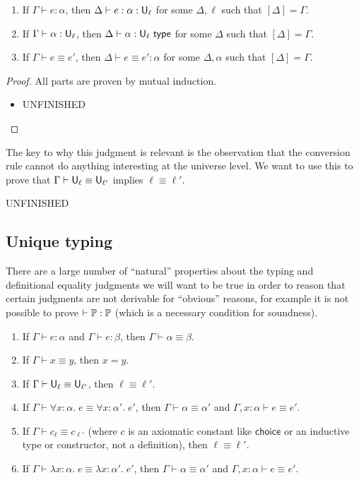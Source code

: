 \begin{lemma}
\begin{enumerate}
\item If $\Gamma\vdash e:\alpha$, then $\Delta\vdash e:\alpha:\U_\ell$ for some $\Delta,\ell$ such that $[\Delta]=\Gamma$.
\item If $\Gamma\vdash \alpha:\U_\ell$, then $\Delta\vdash \alpha:\U_\ell\type$ for some $\Delta$ such that $[\Delta]=\Gamma$.
\item If $\Gamma\vdash e\equiv e'$, then $\Delta\vdash e\equiv e':\alpha$ for some $\Delta,\alpha$ such that $[\Delta]=\Gamma$.
\end{enumerate}
\end{lemma}
\begin{proof}
All parts are proven by mutual induction.
\begin{itemize}
\item UNFINISHED
\end{itemize}
\end{proof}
The key to why this judgment is relevant is the observation that the conversion rule cannot do anything interesting at the universe level. We want to use this to prove that $\Gamma\vdash\U_\ell\equiv\U_{\ell'}$ implies $\ell\equiv\ell'$.

UNFINISHED

\subsection{Unique typing}
There are a large number of ``natural'' properties about the typing and definitional equality judgments we will want to be true in order to reason that certain judgments are not derivable for ``obvious'' reasons, for example it is not possible to prove $\vdash\P:\P$ (which is a necessary condition for soundness).

\begin{theorem}\label{unique}
\begin{enumerate}
\item If $\Gamma\vdash e:\alpha$ and $\Gamma\vdash e:\beta$, then $\Gamma\vdash\alpha\equiv\beta$.
\item If $\Gamma\vdash x\equiv y$, then $x=y$.
\item If $\Gamma\vdash \U_\ell\equiv\U_{\ell'}$, then $\ell\equiv\ell'$.
\item If $\Gamma\vdash \forall x:\alpha.\;e\equiv\forall x:\alpha'.\;e'$, then $\Gamma\vdash \alpha\equiv\alpha'$ and $\Gamma,x:\alpha\vdash e\equiv e'$.
\item If $\Gamma\vdash c_{\ell}\equiv c_{\ell'}$ (where $c$ is an axiomatic constant like $\mathsf{choice}$ or an inductive type or constructor, not a definition), then $\ell\equiv\ell'$.
\item If $\Gamma\vdash \lambda x:\alpha.\;e\equiv\lambda x:\alpha'.\;e'$, then $\Gamma\vdash \alpha\equiv\alpha'$ and $\Gamma,x:\alpha\vdash e\equiv e'$.
\end{enumerate}
\end{theorem}

